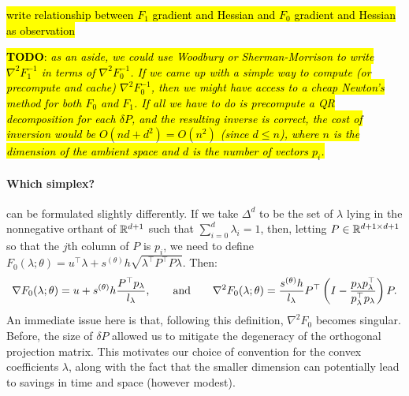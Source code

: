 \documentclass[eikonal.tex]{subfiles}
\begin{document}
\begin{corollary}
  \hl{write relationship between $F_1$ gradient and Hessian and $F_0$
    gradient and Hessian as observation}
\end{corollary}

\noindent \hl{\textbf{TODO}: \emph{as an aside, we could use Woodbury
    or Sherman-Morrison to write $\nabla^2 F_1^{-1}$ in terms of
    $\nabla^2 F_0^{-1}$. If we came up with a simple way to compute
    (or precompute and cache) $\nabla^2 F_0^{-1}$, then we might have
    access to a cheap Newton's method for both $F_0$ and $F_1$. If all
    we have to do is precompute a QR decomposition for each
    $\delta P$, and the resulting inverse is correct, the cost of
    inversion would be $O(nd + d^2) = O(n^2)$ (since $d \leq n$),
    where $n$ is the dimension of the ambient space and $d$ is the
    number of vectors $p_i$.}}

\paragraph{Which simplex?}
 can be formulated
slightly differently. If we take $\Delta^d$ to be the set of $\lambda$
lying in the nonnegative orthant of $\mathbb{R}^{d+1}$ such that
$\sum_{i=0}^d \lambda_i = 1$, then, letting
$P \in \mathbb{R}^{d + 1 \times d + 1}$ so that the $j$th column of $P$ is
$p_i$, we need to define
$F_0(\lambda; \theta) = u^\top \lambda + s^{(\theta)} h \sqrt{\lambda^\top
  P^\top P \lambda}$. Then:
\begin{equation*}
  \nabla F_0(\lambda; \theta) = u + s^{(\theta)} h \frac{P^\top p_\lambda}{l_\lambda}, \qquad \text{and} \qquad \nabla^2 F_0(\lambda; \theta) = \frac{s^{(\theta)} h}{l_\lambda} P^\top \left(I - \frac{p_\lambda p_\lambda^\top}{p_\lambda^\top p_\lambda}\right) P.
\end{equation*}
An immediate issue here is that, following this definition,
$\nabla^2 F_0$ becomes singular. Before, the size of $\delta P$
allowed us to mitigate the degeneracy of the orthogonal projection
matrix. This motivates our choice of convention for the convex
coefficients $\lambda$, along with the fact that the smaller dimension
can potentially lead to savings in time and space (however modest).
\end{document}
